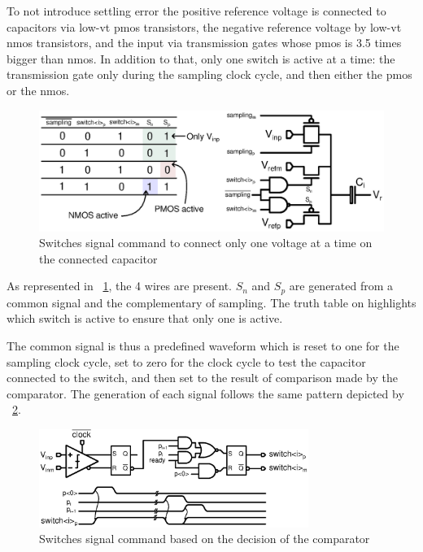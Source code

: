 To not introduce settling error the positive reference voltage is connected to capacitors via low-vt pmos transistors, the negative reference voltage by low-vt nmos transistors, and the input via transmission gates whose pmos is 3.5 times bigger than nmos. In addition to that, only one switch is active at a time: the transmission gate only during the sampling clock cycle, and then either the pmos or the nmos.

\begin{figure}[htp]
	\centering
	\includegraphics[width=\textwidth]{Chapter4/Figs/sar-switches-command-simp.ps}
	\caption{Switches signal command to connect only one voltage at a time on the connected capacitor}
	\label{fig:switches-command}
\end{figure}

As represented in \figurename~\ref{fig:switches-command}, the 4 wires are present. \(S_n\) and \(S_p\) are generated from a common signal and the complementary of sampling. The truth table on highlights which switch is active to ensure that only one is active.

The common signal is thus a predefined waveform which is reset to one for the sampling clock cycle, set to zero for the clock cycle to test the capacitor connected to the switch, and then set to the result of comparison made by the comparator. The generation of each signal follows the same pattern depicted by \figurename~\ref{fig:comp-decision-switches}.

\begin{figure}[htp]
	\centering
	\includegraphics[width=0.78\textwidth]{Chapter4/Figs/comp-decisin-switches.ps}
	\caption{Switches signal command based on the decision of the comparator}
	\label{fig:comp-decision-switches}
\end{figure}

